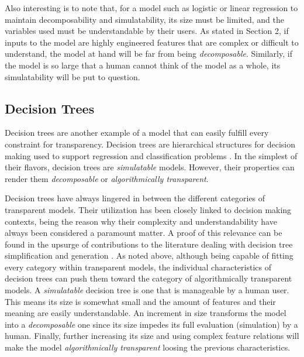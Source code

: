 \documentclass[final]{elsarticle}
\begin{document}
Also interesting is to note that, for a model such as logistic or linear regression to maintain decomposability and simulatability, its size must be limited, and the variables used must be understandable by their users. As stated in Section 2, if inputs to the model are highly engineered features that are complex or difficult to understand, the model at hand will be far from being \textit{decomposable}. Similarly, if the model is so large that a human cannot think of the model as a whole, its simulatability will be put to question. 

\subsection{Decision Trees}

Decision trees are another example of a model that can easily fulfill every constraint for transparency. Decision trees are hierarchical structures for decision making used to support regression and classification problems \cite{quinlan1987simplifying,laurent1976constructing}. In the simplest of their flavors, decision trees are \textit{simulatable} models. However, their properties can render them \textit{decomposable} or \textit{algorithmically transparent}. 

Decision trees have always lingered in between the different categories of transparent models. Their utilization has been closely linked to decision making contexts, being the reason why their complexity and understandability have always been considered a paramount matter. A proof of this relevance can be found in the upsurge of contributions to the literature dealing with decision tree simplification and generation \cite{quinlan1987simplifying,laurent1976constructing,utgoff1989incremental,quinlan1986induction}. As noted above, although being capable of fitting every category within transparent models, the individual characteristics of decision trees can push them toward the category of algorithmically transparent models. A \textit{simulatable} decision tree is one that is manageable by a human user. This means its size is somewhat small and the amount of features and their meaning are easily understandable. An increment in size transforms the model into a \textit{decomposable} one since its size impedes its full evaluation (simulation) by a human. Finally, further increasing its size and using complex feature relations will make the model \textit{algorithmically transparent} loosing the previous characteristics.
\end{document}
